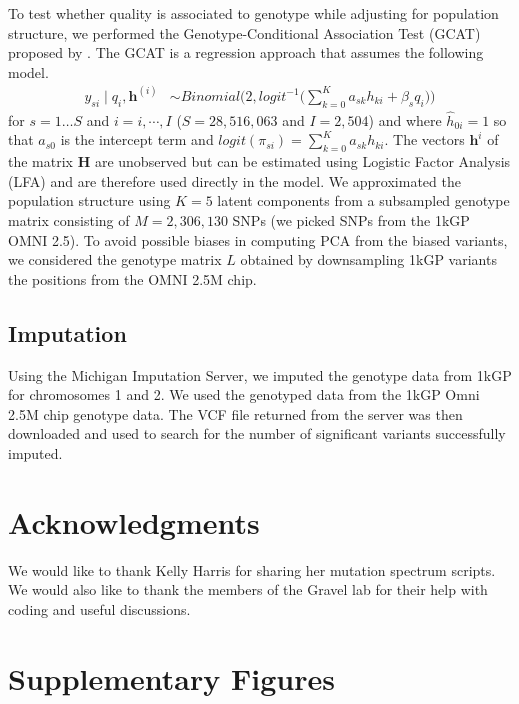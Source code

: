 \documentclass[9pt,lineno]{template}
\begin{document}
To test whether quality is associated to genotype while adjusting for population structure, we performed the Genotype-Conditional Association Test  (GCAT) proposed by \citep{song2015testing}.
The GCAT is a regression approach that assumes the following model.
\begin{align}\label{gcat}
 y_{si} \mid q_i, \boldsymbol{h}^{(i)} &\sim Binomial\bigg( 2, logit^{-1}\Big( \sum_{k=0}^{K} a_{sk} h_{ki} + \beta_s q_i\Big) \bigg)
\end{align} 
for $s=1\hdots S$ and $i=i,\cdots, I$  ($S = 28,516,063$ and $I = 2,504$) and where $\hat{h}_{0i}=1$ so that $a_{s0}$ is the intercept term and $logit(\pi_{si})=\sum_{k=0}^{K} a_{sk} h_{ki}$. 
The vectors $\boldsymbol{h}^{i}$ of the matrix $\mathbf{H}$ are unobserved but can be estimated using Logistic Factor Analysis (LFA) \citep{song2015testing} and are therefore used directly in the model. 
We approximated the population structure using $K=5$ latent components from a subsampled genotype matrix consisting of $M = 2,306,130$ SNPs (we picked SNPs from the 1kGP OMNI 2.5). 
To avoid possible biases in computing PCA from the biased variants, we considered the genotype matrix $L$ obtained by downsampling 1kGP variants the positions from the OMNI 2.5M chip.

\subsection{Imputation}
Using the Michigan Imputation Server, we imputed the genotype data from 1kGP for chromosomes 1 and 2.
We used the genotyped data from the 1kGP Omni 2.5M chip genotype data.
The VCF file returned from the server was then downloaded and used to search for the number of significant variants successfully imputed. 

\section{Acknowledgments}
We would like to thank Kelly Harris for sharing her mutation spectrum scripts.
We would also like to thank the members of the Gravel lab for their help with coding and useful discussions.



\clearpage
\section{Supplementary Figures}
\renewcommand{\thefigure}{S\arabic{figure}}
\setcounter{figure}{0}   	
\end{document}
